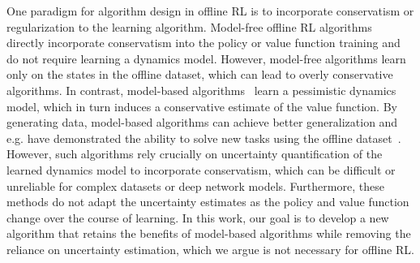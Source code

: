 One paradigm for algorithm design in offline RL is to incorporate conservatism or regularization to the learning algorithm.
Model-free offline RL algorithms~\cite{fujimoto2018addressing, kumar2019stabilizing, wu2019behavior,jaques2019way,kumar2020conservative}
directly incorporate conservatism into the policy or value function training
and do not require learning a dynamics model. 
However, model-free algorithms learn only on the states in the offline dataset, which can lead to overly conservative algorithms.
In contrast, model-based algorithms~\cite{kidambi2020morel, yu2020mopo} learn a pessimistic dynamics model, which in turn induces a conservative estimate of the value function. By generating data, model-based algorithms can achieve better generalization and e.g. have demonstrated the ability to solve new tasks using the offline dataset~\cite{yu2020mopo}.
However, such algorithms rely crucially on uncertainty quantification of the learned dynamics model to incorporate conservatism, which can be difficult or unreliable for complex datasets or deep network models.
Furthermore, these methods do not adapt the uncertainty estimates as the policy and value function change over the course of learning.
In this work, our goal is to develop a new algorithm that retains the benefits of model-based algorithms while removing the reliance on uncertainty estimation, which we argue is not necessary for offline RL.

